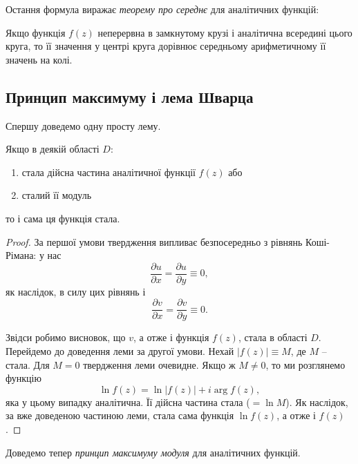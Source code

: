 Остання формула виражає \textit{теорему про середнє} для аналітичних функцій:
\begin{theorem}
Якщо функція $f(z)$ неперервна в замкнутому крузі і аналітична всередині цього круга, то її значення у центрі круга дорівнює середньому арифметичному її значень на колі.
\end{theorem}

\subsection{Принцип максимуму і лема Шварца}
Спершу доведемо одну просту лему.
\begin{lemma}
	Якщо в деякій області $D$:
	\begin{enumerate}
		\item стала дійсна частина аналітичної функції $f(z)$ або
		\item сталий її модуль
	\end{enumerate}
	то і сама ця функція стала.
\end{lemma}

\begin{proof}
За першої умови твердження випливає безпосередньо з рівнянь Коші-Рімана: у нас 
\begin{equation}
	\label{eq:4.5.1}
	\frac{\partial u}{\partial x} = \frac{\partial u}{\partial y} \equiv 0,
\end{equation} як наслідок, в силу цих рівнянь і
\begin{equation}
 	\label{eq:4.5.2}
 	\frac{\partial v}{\partial x} = \frac{\partial v}{\partial y} \equiv 0.
\end{equation}

Звідси робимо висновок, що $v$, а отже і функція $f(z)$, стала в області $D$. \\

Перейдемо до доведення леми за другої умови. Нехай $|f(z)| \equiv M$, де $M$ -- стала. Для $M = 0$ твердження леми очевидне. Якщо ж $M \ne 0$, то ми розглянемо функцію
\begin{equation}
	\label{eq:4.5.3}
	\ln f(z) = \ln |f(z)| + i \arg f(z),
\end{equation}
яка у цьому випадку аналітична. Її дійсна частина стала ($= \ln M$). Як наслідок, за вже доведеною частиною леми, стала сама функція $\ln f(z)$, а отже і $f(z)$.
\end{proof}

Доведемо тепер \textit{принцип максимуму модуля} для аналітичних функцій.

